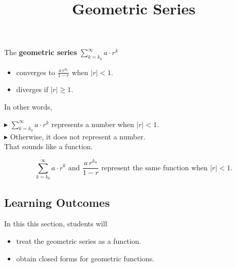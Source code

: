 \documentclass{ximera}
\title{Geometric Series}
\begin{document}
\begin{abstract}
\end{abstract}
\maketitle







\begin{theorem}
The \textbf{\textcolor{purple!85!blue}{geometric series}} $\sum\limits_{k= k_0}^\infty a \cdot r^k$ 
  
  \begin{itemize} 
  \item converges to $\frac{a \, r^{k_0}}{1-r}$ when $|r| < 1$.
  \item diverges if $|r| \geq 1$.  
  \end{itemize}
\end{theorem}




In other words, 


\textbf{\textcolor{blue!55!black}{$\blacktriangleright$}}   $\sum\limits_{k= k_0}^\infty a \cdot r^k$ represents a number when $|r| < 1$. \\

\textbf{\textcolor{blue!55!black}{$\blacktriangleright$}}  Otherwise, it does not represent a number. \\





That sounds like a function.



\[
\sum\limits_{k= k_0}^\infty a \cdot r^k  \text{ and } \frac{a \, r^{k_0}}{1-r} \text{ represent the same function when } |r| < 1.
\]





\subsection{Learning Outcomes}

\begin{sectionOutcomes}
In this this section, students will  

\begin{itemize}
\item treat the geometric series as a function.
\item obtain closed forms for geometric functions.
\end{itemize}
\end{sectionOutcomes}
\end{document}
